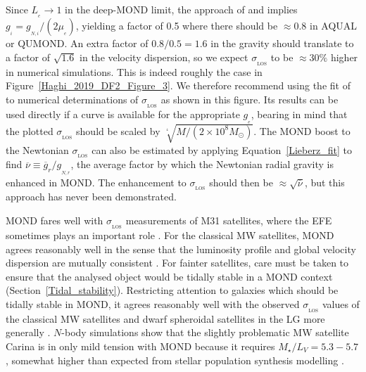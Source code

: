 \documentclass[fleqn,usenatbib,useAMS,onecolumn]{mnras} %
\begin{document}
Since $L_{_e} \to 1$ in the deep-MOND limit, the approach of \citet{Famaey_McGaugh_2012} and \citet{Famaey_2018} implies $g_{_i} = g_{_{N,i}}/\left( 2 \mu_{_e} \right)$, yielding a factor of 0.5 where there should be $\approx 0.8$ in AQUAL or QUMOND. An extra factor of $0.8/0.5 = 1.6$ in the gravity should translate to a factor of $\sqrt{1.6}$ in the velocity dispersion, so we expect $\sigma_{_\text{LOS}}$ to be $\approx 30\%$ higher in numerical simulations. This is indeed roughly the case in Figure~\ref{Haghi_2019_DF2_Figure_3}. We therefore recommend using the fit of \citet{Haghi_2019_DF2} to numerical determinations of $\sigma_{_\text{LOS}}$ as shown in this figure. Its results can be used directly if a curve is available for the appropriate $g_{_e}$, bearing in mind that the plotted $\sigma_{_\text{LOS}}$ should be scaled by $\sqrt[^4]{M/\left( 2 \times 10^8 M_\odot \right)}$. The MOND boost to the Newtonian $\sigma_{_\text{LOS}}$ can also be estimated by applying Equation~\ref{Lieberz_fit} to find $\overline{\nu} \equiv \overline{g}_r/g_{_{N,r}}$, the average factor by which the Newtonian radial gravity is enhanced in MOND. The enhancement to $\sigma_{_\text{LOS}}$ should then be $\approx \sqrt{\overline{\nu}}$, but this approach has never been demonstrated.

MOND fares well with $\sigma_{_\text{LOS}}$ measurements of M31 satellites, where the EFE sometimes plays an important role \citep{McGaugh_2013a, McGaugh_2013b}. For the classical MW satellites, MOND agrees reasonably well in the sense that the luminosity profile and global velocity dispersion are mutually consistent \citep{Sanders_2021}. For fainter satellites, care must be taken to ensure that the analysed object would be tidally stable in a MOND context (Section~\ref{Tidal_stability}). Restricting attention to galaxies which should be tidally stable in MOND, it agrees reasonably well with the observed $\sigma_{_\text{LOS}}$ values of the classical MW satellites \citep{Angus_2008} and dwarf spheroidal satellites in the LG more generally \citep{McGaugh_Wolf_2010}. $N$-body simulations show that the slightly problematic MW satellite Carina is in only mild tension with MOND because it requires $M_{\star}/L_V = 5.3-5.7$, somewhat higher than expected from stellar population synthesis modelling \citep{Angus_2014}.
\end{document}
